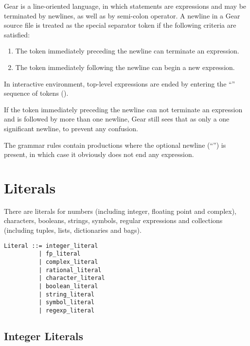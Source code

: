 Gear is a line-oriented language, in which statements are expressions and may be terminated by newlines, as well as by semi-colon operator. A newline in a Gear source file is treated as the special separator token \lstinline@nl@ if the following criteria are satisfied:

\begin{enumerate}
  \item The token immediately preceding the newline can terminate an expression.
  \item The token immediately following the newline can begin a new expression. 
\end{enumerate}

In interactive environment, top-level expressions are ended by entering the ``\code{;;}'' sequence of tokens (). 

If the token immediately preceding the newline can not terminate an expression and is followed by more than one newline, Gear still sees that as only a one significant newline, to prevent any confusion.

The grammar rules contain productions where the optional newline (``\code{[nl]}'') is present, in which case it obviously does not end any expression. 






\section{Literals}
\label{sec:literals}

There are literals for numbers (including integer, floating point and complex), characters, booleans, strings, symbols, regular expressions and collections (including tuples, lists, dictionaries and bags). 

\syntax\begin{lstlisting}
Literal ::= integer_literal
	      | fp_literal
	      | complex_literal
	      | rational_literal
	      | character_literal
	      | boolean_literal
	      | string_literal
	      | symbol_literal
	      | regexp_literal
\end{lstlisting}






\subsection{Integer Literals}
\label{sec:integerliterals}

